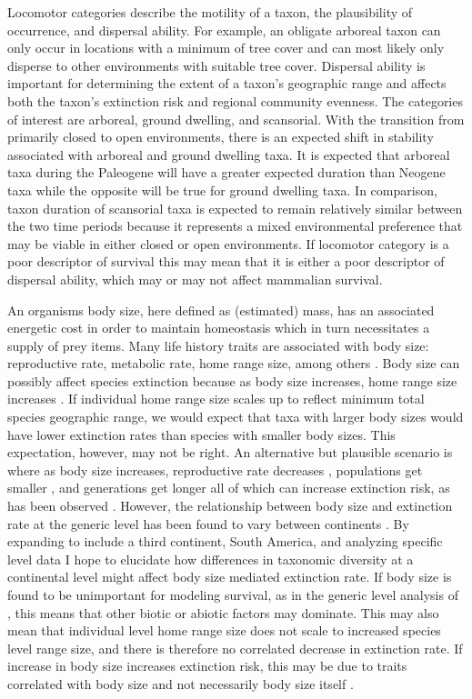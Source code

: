 \documentclass[11pt,letterpaper]{article}
\begin{document}
Locomotor categories describe the motility of a taxon, the plausibility of occurrence, and dispersal ability. For example, an obligate arboreal taxon can only occur in locations with a minimum of tree cover and can most likely only disperse to other environments with suitable tree cover. Dispersal ability is important for determining the extent of a taxon's geographic range \citep{Birand2012,Jablonski2006a,Gaston2009} and affects both the taxon's extinction risk and regional community evenness. The categories of interest are arboreal, ground dwelling, and scansorial. With the transition from primarily closed to open environments, there is an expected shift in stability associated with arboreal and ground dwelling taxa. It is expected that arboreal taxa during the Paleogene will have a greater expected duration than Neogene taxa while the opposite will be true for ground dwelling taxa. In comparison, taxon duration of scansorial taxa is expected to remain relatively similar between the two time periods because it represents a mixed environmental preference that may be viable in either closed or open environments. If locomotor category is a poor descriptor of survival this may mean that it is either a poor descriptor of dispersal ability, which may or may not affect mammalian survival. 

An organisms body size, here defined as (estimated) mass, has an associated energetic cost in order to maintain homeostasis which in turn necessitates a supply of prey items. Many life history traits are associated with body size: reproductive rate, metabolic rate, home range size, among others \cite{Peters1983a,Damuth1979,Brown1987,Smith2004}. Body size can possibly affect species extinction because as body size increases, home range size increases \citep{Damuth1979}. If individual home range size scales up to reflect minimum total species geographic range, we would expect that taxa with larger body sizes would have lower extinction rates than species with smaller body sizes. This expectation, however, may not be right. An alternative but plausible scenario is where as body size increases, reproductive rate decreases \citep{Johnson2002b}, populations get smaller \citep{White2007}, and generations get longer \citep{Martin1993a} all of which can increase extinction risk, as has been observed \citep{Liow2008,Davidson2012}. However, the relationship between body size and extinction rate at the generic level has been found to vary between continents \citep{Tomiya2013,Liow2008}. By expanding to include a third continent, South America, and analyzing specific level data I hope to elucidate how differences in taxonomic diversity at a continental level might affect body size mediated extinction rate. If body size is found to be unimportant for modeling survival, as in the generic level analysis of \citet{Tomiya2013}, this means that other biotic or abiotic factors may dominate. This may also mean that individual level home range size does not scale to increased species level range size, and there is therefore no correlated decrease in extinction rate. If increase in body size increases extinction risk, this may be due to traits correlated with body size and not necessarily body size itself \citep{Johnson2002b}.
\end{document}
